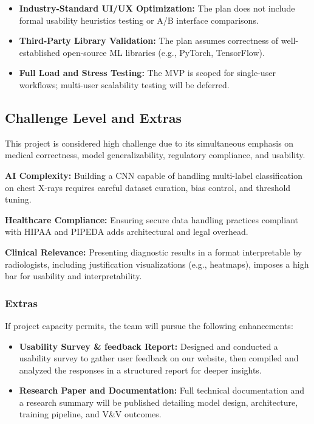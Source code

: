 \documentclass[12pt, titlepage]{article}
\begin{document}
\begin{itemize}
  \item \textbf{Industry-Standard UI/UX Optimization:} The plan does not include formal usability heuristics testing or A/B interface comparisons.
  \item \textbf{Third-Party Library Validation:} The plan assumes correctness of well-established open-source ML libraries (e.g., PyTorch, TensorFlow).
  \item \textbf{Full Load and Stress Testing:} The MVP is scoped for single-user workflows; multi-user scalability testing will be deferred.
\end{itemize}

\subsection{Challenge Level and Extras}
This project is considered high challenge due to its simultaneous emphasis on medical correctness, model generalizability, regulatory compliance, and usability.

\textbf{AI Complexity:} Building a CNN capable of handling multi-label classification on chest X-rays requires careful dataset curation, bias control, and threshold tuning.

\textbf{Healthcare Compliance:} Ensuring secure data handling practices compliant with HIPAA and PIPEDA adds architectural and legal overhead.

\textbf{Clinical Relevance:} Presenting diagnostic results in a format interpretable by radiologists, including justification visualizations (e.g., heatmaps), imposes a high bar for usability and interpretability.

\subsubsection{Extras}
If project capacity permits, the team will pursue the following enhancements:

\begin{itemize}
  \item \textbf{Usability Survey \& feedback Report:} Designed and conducted a usability survey to gather user feedback on our website, then compiled and analyzed the responses in a structured report for deeper insights.  
  \item \textbf{Research Paper and Documentation:} Full technical documentation and a research summary will be published detailing model design, architecture, training pipeline, and V\&V outcomes.
\end{itemize}
\end{document}

